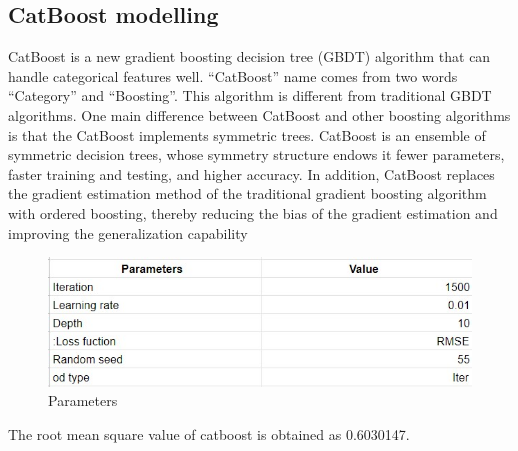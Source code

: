 \subsection{CatBoost modelling}
CatBoost is a new gradient boosting decision tree (GBDT) algorithm that can handle categorical features well. “CatBoost” name comes from two words “Category” and “Boosting”. This algorithm is different from traditional GBDT algorithms. One main difference between CatBoost and other boosting algorithms is that the CatBoost implements symmetric trees.
   CatBoost is an ensemble of symmetric decision trees, whose symmetry structure endows it fewer parameters, faster training and testing, and higher accuracy. In addition, CatBoost replaces the gradient estimation method of the traditional gradient boosting algorithm with ordered boosting, thereby reducing the bias of the gradient estimation and improving the generalization capability
\begin{figure}[h]
\label{bd}
\centering
\includegraphics[width= 11 cm]{cat1.jpg}
\caption{Parameters}
\end{figure}\linebreak
The root mean square value of catboost is obtained as 0.6030147.

 

